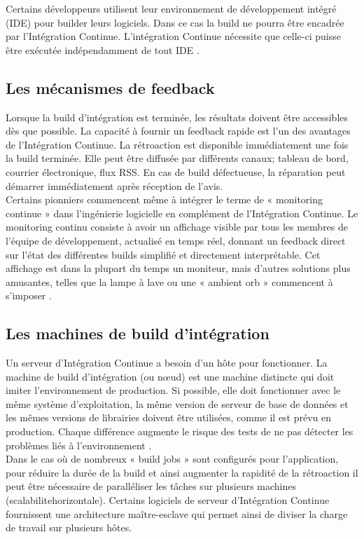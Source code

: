     Certains développeurs utilisent leur environnement de développement intégré (IDE) pour builder leurs logiciels. Dans ce cas la build ne pourra être encadrée par l’Intégration Continue. L’intégration Continue nécessite que celle-ci puisse être exécutée indépendamment de tout IDE \cite{Duv07}.

    \subsection{Les mécanismes de feedback}
    Lorsque la build d'intégration est terminée, les résultats doivent être accessibles dès que possible. La capacité à fournir un feedback rapide est l'un des avantages de l’Intégration Continue. La rétroaction est disponible immédiatement une fois la build terminée. Elle peut être diffusée par différents canaux; tableau de bord, courrier électronique, flux RSS. En cas de build défectueuse, la réparation peut démarrer immédiatement après réception de l'avis.\\

    Certains pionniers commencent même à intégrer le terme de « monitoring continue » dans l’ingénierie logicielle en complément de l’Intégration Continue. Le monitoring continu consiste à avoir un affichage visible par tous les membres de l’équipe de développement, actualisé en temps réel, donnant un feedback direct sur l’état des différentes builds simplifié et directement interprétable. Cet affichage est dans la plupart du temps un moniteur, mais d’autres solutions plus amusantes, telles que la lampe à lave ou une « ambient orb » commencent à s’imposer \cite{Swa04}.

    \subsection{Les machines de build d’intégration}
    Un serveur d’Intégration Continue a besoin d'un hôte pour fonctionner. La machine de build d’intégration (ou nœud) est une machine distincte qui doit imiter l'environnement de production. Si possible, elle doit fonctionner avec le même système d'exploitation, la même version de serveur de base de données et les mêmes versions de librairies doivent être utilisées, comme il est prévu en production. Chaque différence augmente le risque des tests de ne pas détecter les problèmes liés à l’environnement \cite{Fow06}.\\

    Dans le cas où de nombreux « build jobs » sont configurés pour l’application, pour réduire la durée de la build et ainsi augmenter la rapidité de la rétroaction il peut être nécessaire de paralléliser les tâches sur plusieurs machines (\gls{scalabilitehorizontale}). Certains logiciels de serveur d’Intégration Continue fournissent une architecture maître-esclave qui permet ainsi de diviser la charge de travail sur plusieurs hôtes.\\

